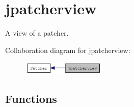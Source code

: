 \hypertarget{group__jpatcherview}{
\section{jpatcherview}
\label{group__jpatcherview}
}


A view of a patcher.  


Collaboration diagram for jpatcherview:\nopagebreak
\begin{figure}[H]
\begin{center}
\leavevmode
\includegraphics[width=112pt]{group__jpatcherview}
\end{center}
\end{figure}
\subsection*{Functions}

